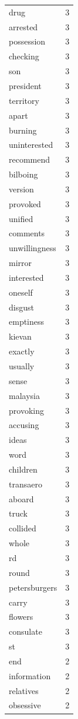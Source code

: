 \begin{tabular}{lr}
drug & 3 \\
arrested & 3 \\
possession & 3 \\
checking & 3 \\
son & 3 \\
president & 3 \\
territory & 3 \\
apart & 3 \\
burning & 3 \\
uninterested & 3 \\
recommend & 3 \\
bilboing & 3 \\
version & 3 \\
provoked & 3 \\
unified & 3 \\
comments & 3 \\
unwillingness & 3 \\
mirror & 3 \\
interested & 3 \\
oneself & 3 \\
disgust & 3 \\
emptiness & 3 \\
kievan & 3 \\
exactly & 3 \\
usually & 3 \\
sense & 3 \\
malaysia & 3 \\
provoking & 3 \\
accusing & 3 \\
ideas & 3 \\
word & 3 \\
children & 3 \\
transaero & 3 \\
aboard & 3 \\
truck & 3 \\
collided & 3 \\
whole & 3 \\
rd & 3 \\
round & 3 \\
petersburgers & 3 \\
carry & 3 \\
flowers & 3 \\
consulate & 3 \\
st & 3 \\
end & 2 \\
information & 2 \\
relatives & 2 \\
obsessive & 2 \\

\end{tabular}
